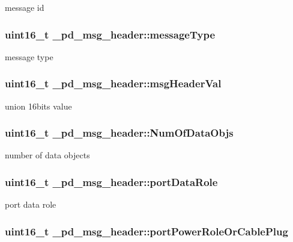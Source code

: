 message id \hypertarget{struct__pd__msg__header_a8f988edb3c2320265a31f058551383de}{
\subsubsection[{message\-Type}]{\setlength{\rightskip}{0pt plus 5cm}uint16\-\_\-t \-\_\-pd\-\_\-msg\-\_\-header\-::message\-Type}}\label{struct__pd__msg__header_a8f988edb3c2320265a31f058551383de}
message type \hypertarget{struct__pd__msg__header_a3be91c1e7084d53533ddf706f450c28b}{
\subsubsection[{msg\-Header\-Val}]{\setlength{\rightskip}{0pt plus 5cm}uint16\-\_\-t \-\_\-pd\-\_\-msg\-\_\-header\-::msg\-Header\-Val}}\label{struct__pd__msg__header_a3be91c1e7084d53533ddf706f450c28b}
union 16bits value \hypertarget{struct__pd__msg__header_af835bee782d843ce60f85c5734a628b4}{
\subsubsection[{Num\-Of\-Data\-Objs}]{\setlength{\rightskip}{0pt plus 5cm}uint16\-\_\-t \-\_\-pd\-\_\-msg\-\_\-header\-::\-Num\-Of\-Data\-Objs}}\label{struct__pd__msg__header_af835bee782d843ce60f85c5734a628b4}
number of data objects \hypertarget{struct__pd__msg__header_a61dc0107cc94695c5225a034732acc25}{
\subsubsection[{port\-Data\-Role}]{\setlength{\rightskip}{0pt plus 5cm}uint16\-\_\-t \-\_\-pd\-\_\-msg\-\_\-header\-::port\-Data\-Role}}\label{struct__pd__msg__header_a61dc0107cc94695c5225a034732acc25}
port data role \hypertarget{struct__pd__msg__header_ac52d867212ad7dd16b5202a1fee17866}{
\subsubsection[{port\-Power\-Role\-Or\-Cable\-Plug}]{\setlength{\rightskip}{0pt plus 5cm}uint16\-\_\-t \-\_\-pd\-\_\-msg\-\_\-header\-::port\-Power\-Role\-Or\-Cable\-Plug}}\label{struct__pd__msg__header_ac52d867212ad7dd16b5202a1fee17866}

